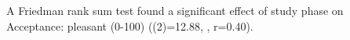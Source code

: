 A Friedman rank sum test found a significant effect of study phase on Acceptance: pleasant (0-100) (\chisq(2)=12.88, , r=0.40). 
